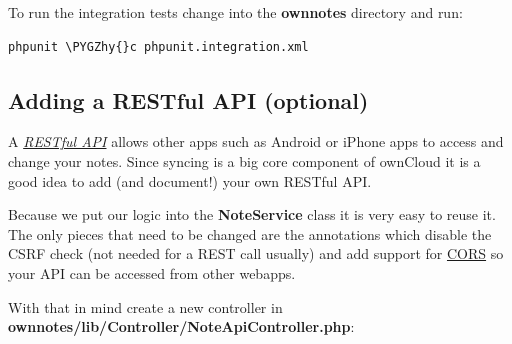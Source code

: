 \documentclass[letterpaper,10pt,english]{sphinxmanual}
\def\PYGZhy{\char`\-}
\begin{document}
To run the integration tests change into the \textbf{ownnotes} directory and run:

\begin{Verbatim}[commandchars=\\\{\}]
phpunit \PYGZhy{}c phpunit.integration.xml
\end{Verbatim}


\subsection{Adding a RESTful API (optional)}
\label{app/tutorial:adding-a-restful-api-optional}
A {\hyperref[app/api::doc]{\emph{\emph{RESTful API}}}} allows other apps such as Android or iPhone apps to access and change your notes. Since syncing is a big core component of ownCloud it is a good idea to add (and document!) your own RESTful API.

Because we put our logic into the \textbf{NoteService} class it is very easy to reuse it. The only pieces that need to be changed are the annotations which disable the CSRF check (not needed for a REST call usually) and add support for \href{https://developer.mozilla.org/en-US/docs/Web/HTTP/Access\_control\_CORS}{CORS} so your API can be accessed from other webapps.

With that in mind create a new controller in \textbf{ownnotes/lib/Controller/NoteApiController.php}:
\end{document}
